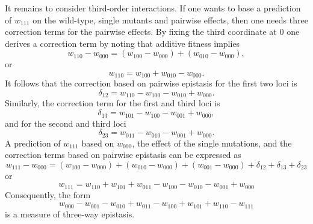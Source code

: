 \documentclass[12pt]{amsart}
\theoremstyle{plain}
\theoremstyle{definition}
\begin{document}
It remains to consider third-order interactions. 
If one wants to base a prediction of $w_{111}$
on the wild-type, single mutants and 
pairwise effects, then one needs three correction terms
for the pairwise effects.
By fixing the third coordinate at $0$ one derives
a correction term by noting that additive fitness
implies
\[
w_{110}-w_{000}=(w_{100}-w_{000})+(w_{010}-w_{000}),
\]
or
\[
w_{110}=w_{100}+w_{010}-w_{000}.
\]
It follows that the correction based on pairwise epistasis for the first two loci is
\[
\delta_{12}= w_{110}-w_{100}-w_{010}+w_{000}.
\]
Similarly, the correction term for the first and third loci is
\[
\delta_{13} =w_{101}-w_{100}-w_{001}+w_{000},
\]
and for the second and third loci
\[
\delta_{23} =w_{011}-w_{010}-w_{001}+w_{000}.
\]
A prediction of $w_{111}$ based on $w_{000}$, the effect of the single mutations,
and the correction terms based on pairwise epistasis can be expressed as
\[
w_{111}-w_{000}=(w_{100}-w_{000})+(w_{010}-w_{000})+(w_{001}-w_{000})+ \delta_{12} +\delta_{13}+\delta_{23}
\]
or
\[
w_{111}=w_{110}+w_{101}+w_{011}-w_{100}-w_{010}-w_{001}+w_{000}
\]
Consequently, the form
\begin{equation}\label{w33}
w_{000}-w_{001}-w_{010}+w_{011}-w_{100} +w_{101}+w_{110} - w_{111}
\end{equation}
is a measure of three-way epistasis.
\end{document}

